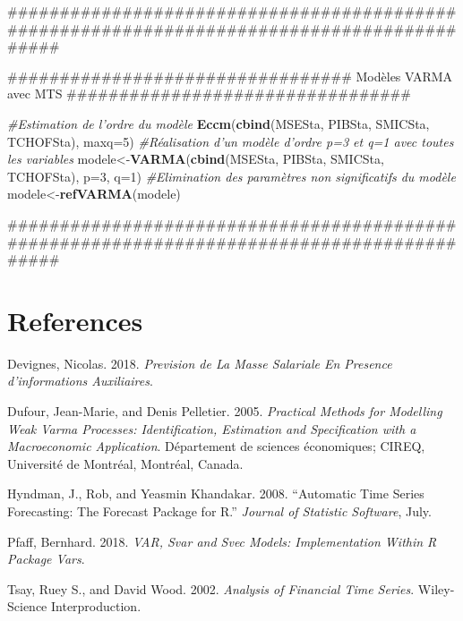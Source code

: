 \documentclass[11pt,]{article}
\newenvironment{Shaded}{\begin{snugshade}}{\end{snugshade}}
\newcommand{\KeywordTok}[1]{\textcolor[rgb]{0.13,0.29,0.53}{\textbf{{#1}}}}
\newcommand{\DataTypeTok}[1]{\textcolor[rgb]{0.13,0.29,0.53}{{#1}}}
\newcommand{\DecValTok}[1]{\textcolor[rgb]{0.00,0.00,0.81}{{#1}}}
\newcommand{\CommentTok}[1]{\textcolor[rgb]{0.56,0.35,0.01}{\textit{{#1}}}}
\newcommand{\NormalTok}[1]{{#1}}
\begin{document}
\begin{Shaded}
\begin{Highlighting}[]
\NormalTok{###########################################################################################}

\NormalTok{################################# Modèles VARMA avec MTS #################################}

\CommentTok{#Estimation de l'ordre du modèle}
\KeywordTok{Eccm}\NormalTok{(}\KeywordTok{cbind}\NormalTok{(MSESta, PIBSta, SMICSta, TCHOFSta), }\DataTypeTok{maxq=}\DecValTok{5}\NormalTok{)}
\CommentTok{#Réalisation d'un modèle d'ordre p=3 et q=1 avec toutes les variables}
\NormalTok{modele<-}\KeywordTok{VARMA}\NormalTok{(}\KeywordTok{cbind}\NormalTok{(MSESta, PIBSta, SMICSta, TCHOFSta), }\DataTypeTok{p=}\DecValTok{3}\NormalTok{, }\DataTypeTok{q=}\DecValTok{1}\NormalTok{)}
\CommentTok{#Elimination des paramètres non significatifs du modèle}
\NormalTok{modele<-}\KeywordTok{refVARMA}\NormalTok{(modele)}

\NormalTok{###########################################################################################}
\end{Highlighting}
\end{Shaded}

\newpage

\section*{References}\label{references}

\hypertarget{refs}{}
\hypertarget{ref-Nicolas}{}
Devignes, Nicolas. 2018. \emph{Prevision de La Masse Salariale En
Presence d'informations Auxiliaires}.

\hypertarget{ref-varma}{}
Dufour, Jean-Marie, and Denis Pelletier. 2005. \emph{Practical Methods
for Modelling Weak Varma Processes: Identification, Estimation and
Specification with a Macroeconomic Application}. Département de sciences
économiques; CIREQ, Université de Montréal, Montréal, Canada.

\hypertarget{ref-forecast}{}
Hyndman, J., Rob, and Yeasmin Khandakar. 2008. ``Automatic Time Series
Forecasting: The Forecast Package for R.'' \emph{Journal of Statistic
Software}, July.

\hypertarget{ref-vars}{}
Pfaff, Bernhard. 2018. \emph{VAR, Svar and Svec Models: Implementation
Within R Package Vars}.

\hypertarget{ref-MTS}{}
Tsay, Ruey S., and David Wood. 2002. \emph{Analysis of Financial Time
Series}. Wiley-Science Interproduction.
\end{document}

